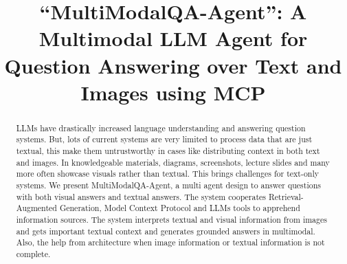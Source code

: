 \documentclass[conference]{IEEEtran}
\begin{document}
\title{``MultiModalQA-Agent'': A Multimodal LLM Agent for Question Answering over Text and Images using MCP}

\author{
\and
{}
\and
{}
\and
{}
\and
{}
}

\maketitle


\begin{abstract}
LLMs have drastically increased language understanding and answering question systems. But, lots of current systems are very limited to process data that are just textual, this make them untrustworthy in cases like distributing context in both text and images. In knowledgeable materials, diagrams, screenshots, lecture slides and many more often showcase visuals rather than textual. This brings challenges for text-only systems. We present MultiModalQA-Agent, a multi agent design to answer questions with both visual answers and textual answers. The system cooperates Retrieval-Augmented Generation, Model Context Protocol and LLMs tools to apprehend information sources. The system interprets textual and visual information from images and gets important textual context and generates grounded answers in multimodal. Also, the help from architecture when image information or textual information is not complete.
\end{abstract}
\end{document}
